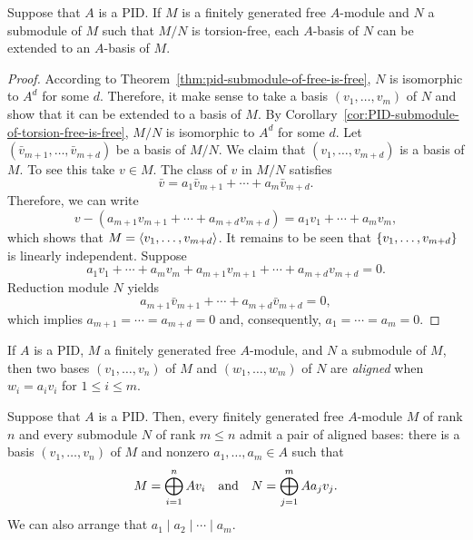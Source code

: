 \begin{cor}\label{cor:PID-basis-extension}
    Suppose that\/ $A$ is a PID. If\/ $M$ is a finitely generated free\/ $A$-module and\/ $N$ a submodule of\/ $M$ such that\/ $M/N$ is torsion-free, each\/ $A$-basis of\/ $N$ can be extended to an\/ $A$-basis of\/ $M$.
\end{cor}

\begin{proof}
     According to Theorem~\ref{thm:pid-submodule-of-free-is-free}, $N$ is isomorphic to $A^d$ for some $d$. Therefore, it make sense to take a basis $(v_1,\dots,v_m)$ of $N$ and show that it can be extended to a basis of $M$. By Corollary~\ref{cor:PID-submodule-of-torsion-free-is-free}, $M/N$ is isomorphic to $A^d$ for some $d$. Let $(\bar v_{m+1},\dots,\bar v_{m+d})$ be a basis of $M/N$. We claim that $(v_1,\dots,v_{m+d})$ is a basis of $M$. To see this take $v\in M$. The class of $v$ in $M/N$ satisfies
    $$
        \bar v = a_1\bar v_{m+1}+\cdots+a_m\bar v_{m+d}.
    $$
    Therefore, we can write
    $$
        v-(a_{m+1}v_{m+1}+\cdots+a_{m+d}v_{m+d})
            =a_1v_1+\cdots+a_mv_m,
    $$
    which shows that $M=\langle v_1,\dots,v_{m+d}\rangle$. It remains to be seen that $\{v_1,\dots,v_{m+d}\}$ is linearly independent. Suppose
    $$
        a_1v_1+\cdots+a_mv_m
            + a_{m+1}v_{m+1}+\cdots+a_{m+d}v_{m+d} = 0.
    $$
    Reduction module $N$ yields
    $$
        a_{m+1}\bar v_{m+1}+\cdots+a_{m+d}\bar v_{m+d}=0,
    $$
    which implies $a_{m+1}=\cdots=a_{m+d}=0$ and, consequently, $a_1=\cdots=a_m=0$.
    
\end{proof}

\begin{defn}
    If\/ $A$ is a PID, $M$ a finitely generated free\/ $A$-module, and\/ $N$ a submodule of\/ $M$, then two bases $(v_1, \dots, v_n)$ of\/ $M$ and $(w_1, \dots, w_m)$ of\/ $N$ are \textsl{aligned} when $w_i=a_iv_i$ for $1\le i\le m$.
\end{defn}


\begin{thm}\label{thm:aligned-bases}
    Suppose that $A$ is a PID. Then, every finitely generated free\/ $A$-module\/ $M$ of rank\/ $n$ and every submodule\/ $N$ of rank\/ $m \le n$ admit a pair of aligned bases: there is a basis\/ $(v_1, \dots, v_n)$ of\/ $M$ and nonzero\/ $a_1, \dots, a_m \in A$ such that
    $$
    M = \bigoplus_{i=1}^n A v_i \quad \text{\rm and} \quad N = \bigoplus_{j=1}^m A a_j v_j.
    $$
    We can also arrange that\/ $a_1 \mid a_2 \mid \cdots \mid a_m$.
\end{thm}

